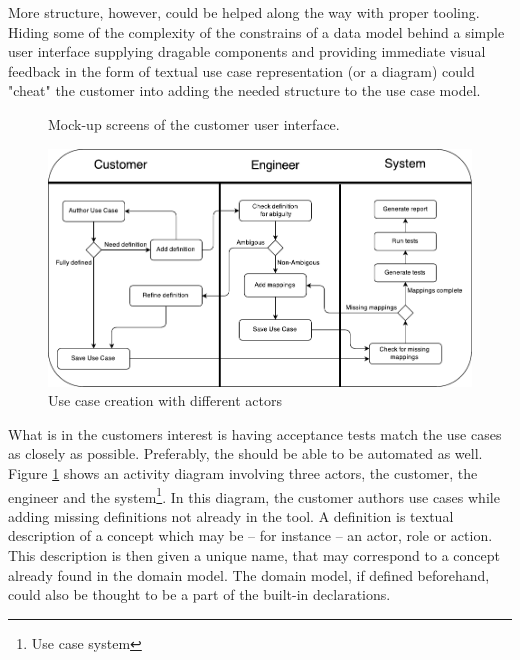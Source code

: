More structure, however, could be helped along the way with proper tooling. Hiding some of the complexity of the constrains of a data model behind a simple user interface supplying dragable components and providing immediate visual feedback in the form of textual use case representation (or a diagram) could "cheat" the customer into adding the needed structure to the use case model.
\begin{figure}[!htbp]
  \centering
    
  \caption{Mock-up screens of the customer user interface.}
\end{figure}


\begin{figure}[h]
\includegraphics[scale=0.75]{img/use_case_creation_activity_diagram}
\centering
\caption{Use case creation with different actors}
\label{fig:use_case_creation_activity_diagram}
\end{figure}

What is in the customers interest is having acceptance tests match the use cases as closely as possible. Preferably, the should be able to be automated as well. Figure \ref{fig:use_case_creation_activity_diagram} shows an activity diagram involving three actors, the customer, the engineer and the system\footnote{Use case system}. In this diagram, the customer authors use cases while adding missing definitions not already in the tool. A definition is textual description of a concept which may be -- for instance -- an actor, role or action. This description is then given a unique name, that may correspond to a concept already found in the domain model. The domain model, if defined beforehand, could also be thought to be a part of the built-in declarations.

